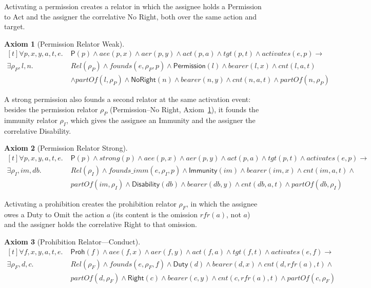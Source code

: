 \documentclass{IOS-Book-Article}
\newcommand{\activates}{\mathit{activates}}
\newcommand{\founds}{\mathit{founds}}
\newcommand{\Perm}{\mathsf{P}}           %
\newcommand{\PermPos}{\mathsf{Permission}}   %
\newcommand{\Duty}{\mathsf{Duty}}            %
\newcommand{\Right}{\mathsf{Right}}          %
\newcommand{\NoRight}{\mathsf{NoRight}}      %
\newcommand{\Disability}{\mathsf{Disability}} %
\newcommand{\Immunity}{\mathsf{Immunity}}
\newcommand{\Proh}{\mathsf{Proh}}
\theoremstyle{definition}
\newtheorem{axiom}{Axiom}[section]
\begin{document}
\noindent Activating a permission creates a relator in which the
assignee holds a Permission to Act and the assigner the correlative No Right,
both over the same action and target.
\begin{axiom}[Permission Relator Weak]
\label{ax:perm-relator-weak}
\[
\begin{aligned}[t]
\forall p,x,y,a,t,e.\;&
\Perm(p)\land\mathit{aee}(p,x)\land\mathit{aer}(p,y)\land
\mathit{act}(p,a)\land\mathit{tgt}(p,t)\land\activates(e,p)\to\\
\exists\rho_P,l,n.\;&
\mathit{Rel}(\rho_P)\land\founds(e,\rho_P,p)\land
\PermPos(l)\land\mathit{bearer}(l,x)\land
\mathit{cnt}(l,a,t)\\
&\land\mathit{partOf}(l,\rho_P)\land
\NoRight(n)\land\mathit{bearer}(n,y)\land
\mathit{cnt}(n,a,t)\land\mathit{partOf}(n,\rho_P)
\end{aligned}
\]
\end{axiom}
\noindent A strong permission also founds a second relator at the same
activation event: besides the permission relator $\rho_P$ (Permission--No Right,
Axiom~\ref{ax:perm-relator-weak}), it founds the immunity relator $\rho_I$,
which gives the assignee an Immunity and the assigner the correlative Disability.
\begin{axiom}[Permission Relator Strong]
\label{ax:perm-relator-strong}
\[
\begin{aligned}[t]
\forall p,x,y,a,t,e.\;&
\Perm(p)\land\mathit{strong}(p)\land\mathit{aee}(p,x)\land
\mathit{aer}(p,y)\land\mathit{act}(p,a)\land\mathit{tgt}(p,t)\land\activates(e,p)\to\\
\exists\rho_I,im,db.\;&
\mathit{Rel}(\rho_I)\land\mathit{founds\_imm}(e,\rho_I,p)\land
\Immunity(im)\land\mathit{bearer}(im,x)\land\mathit{cnt}(im,a,t)\land\\
&\mathit{partOf}(im,\rho_I)\land
\Disability(db)\land\mathit{bearer}(db,y)\land
\mathit{cnt}(db,a,t)\land\mathit{partOf}(db,\rho_I)
\end{aligned}
\]
\end{axiom}
\noindent Activating a prohibition creates the prohibition relator $\rho_F$, in
which the assignee owes a Duty to Omit the action $a$ (its content is the
omission $\mathit{rfr}(a)$, not $a$) and the assigner holds the correlative
Right to that omission.
\begin{axiom}[Prohibition Relator---Conduct]
\label{ax:proh-relator-conduct}
\[
\begin{aligned}[t]
\forall f,x,y,a,t,e.\;&
\Proh(f)\land\mathit{aee}(f,x)\land\mathit{aer}(f,y)\land
\mathit{act}(f,a)\land\mathit{tgt}(f,t)\land\activates(e,f)\to\\
\exists\rho_F,d,c.\;&
\mathit{Rel}(\rho_F)\land\founds(e,\rho_F,f)\land
\Duty(d)\land\mathit{bearer}(d,x)\land\mathit{cnt}(d,\mathit{rfr}(a),t)\land\\
&\mathit{partOf}(d,\rho_F)\land
\Right(c)\land\mathit{bearer}(c,y)\land
\mathit{cnt}(c,\mathit{rfr}(a),t)\land\mathit{partOf}(c,\rho_F)
\end{aligned}
\]
\end{axiom}
\end{document}
